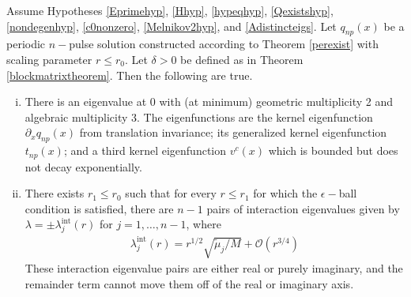 \documentclass[thesis.tex]{subfiles}
\begin{document}

\begin{theorem}\label{locateeigtheorem}
Assume Hypotheses \ref{Eprimehyp}, \ref{Hhyp}, \ref{hypeqhyp}, \ref{Qexistshyp}, \ref{nondegenhyp}, \ref{c0nonzero}, \ref{Melnikov2hyp}, and \ref{Adistincteigs}. Let $q_{np}(x)$ be a periodic $n-$pulse solution constructed according to Theorem \ref{perexist} with scaling parameter $r \leq r_0$. Let $\delta > 0$ be defined as in Theorem \ref{blockmatrixtheorem}. Then the following are true.

\begin{enumerate}[(i)]

\item There is an eigenvalue at 0 with (at minimum) geometric multiplicity 2 and algebraic multiplicity 3. The eigenfunctions are the kernel eigenfunction $\partial_x q_{np}(x)$ from translation invariance; its generalized kernel eigenfunction $t_{np}(x)$; and a third kernel eigenfunction $v^c(x)$ which is bounded but does not decay exponentially.

\item There exists $r_1 \leq r_0$ such that for every $r \leq r_1$ for which the $\epsilon-$ball condition is satisfied, there are $n - 1$ pairs of interaction eigenvalues given by $\lambda = \pm \lambda^{\text{int}}_j(r)$ for $j = 1, \dots, n-1$, where
\begin{align*}
\lambda^{\text{int}}_j(r) = r^{1/2} \sqrt{\tilde{\mu}_j / M} + \mathcal{O}(r^{3/4})
\end{align*}
These interaction eigenvalue pairs are either real or purely imaginary, and the remainder term cannot move them off of the real or imaginary axis.




\end{enumerate}
\end{theorem}
\end{document}
